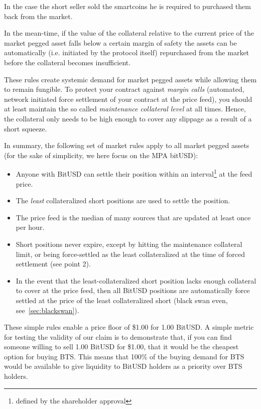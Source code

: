 In the case the short seller sold the smartcoins he is required to purchased
them back from the market. 

In the mean-time, if the value of the collateral relative to the current price
of the market pegged asset falls below a certain margin of safety the assets
can be automatically (i.e. initiated by the protocol itself) repurchased from
the market before the collateral becomes insufficient.

These rules create systemic demand for market pegged assets while allowing them
to remain fungible. To protect your contract against \emph{margin calls}
(automated, network initiated force settlement of your contract at the price
feed), you should at least maintain the so called \emph{maintenance collateral
level} at all times. Hence, the collateral only needs to be high enough to
cover any slippage as a result of a short squeeze.

In summary, the following set of market rules apply to all market pegged assets
(for the sake of simplicity, we here focus on the MPA bitUSD):
\begin{itemize}
 \item Anyone with BitUSD can settle their position within an
       interval\footnote{defined by the shareholder approval} at the feed
       price.
 \item The \emph{least} collateralized short positions are used to settle the
       position.
 \item The price feed is the median of many sources that are updated at least
       once per hour.
 \item Short positions never expire, except by hitting the maintenance
       collateral limit, or being force-settled as the least collateralized at the
       time of forced settlement (see point 2).
 \item In the event that the least-collateralized short position lacks enough
       collateral to cover at the price feed, then all BitUSD positions are
       automatically force settled at the price of the least collateralized
       short (black swan even, see~\cref{sec:blackswan}).
\end{itemize}

These simple rules enable a price floor of \$1.00 for 1.00 BitUSD. A simple
metric for testing the validity of our claim is to demonstrate that, if you can
find someone willing to sell 1.00 BitUSD for \$1.00, that it would be the
cheapest option for buying BTS. This means that 100\% of the buying demand for
BTS would be available to give liquidity to BitUSD holders as a priority over
BTS holders.
